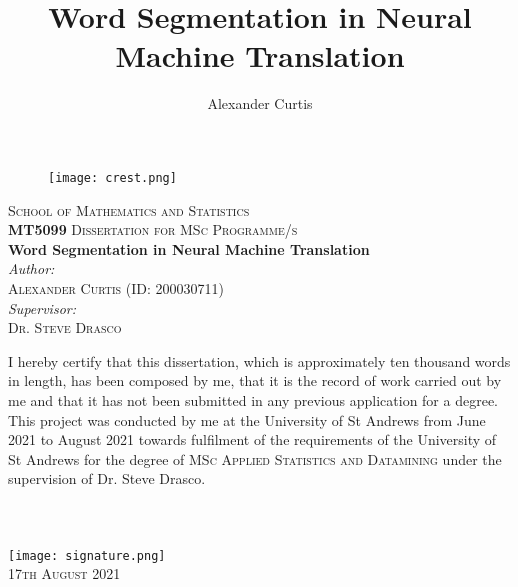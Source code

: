 \documentclass[11pt]{article}
\title{Word Segmentation in Neural Machine Translation}
\author{Alexander Curtis}
\begin{document}
\begin{titlepage}
\begin{center}
    \begin{figure}[h]
    \centering
    \texttt{[image: crest.png]}
    \end{figure}
    \textsc{School of Mathematics and Statistics} \\
    \textsc{\textbf{MT5099} Dissertation for MSc Programme/s} \\
    \vspace{1cm}
    \huge{\textbf{Word Segmentation in Neural Machine Translation}} \\
    \vspace{1cm}
    \normalsize
    \textit{Author:} \\
    \textsc{Alexander Curtis (ID: 200030711)} \\
    \textit{Supervisor:} \\
    \textsc{Dr. Steve Drasco} \\
    \vspace{3cm}
    \end{center}
    I hereby certify that this dissertation, which is approximately ten thousand words in length, has been composed by me, that it is the record of work carried out by me and that it has not been submitted in any previous application for a degree. This project was conducted by me at the University of St Andrews from June 2021 to August 2021 towards fulfilment of the requirements of the University of St Andrews for the degree of \textsc{MSc Applied Statistics and Datamining} under the supervision of Dr. Steve Drasco. \\
    \\
    \\
    \\
    \vspace{1cm}
    \texttt{[image: signature.png]} \\
    \vspace{1cm}
    \textsc{17th August 2021}
\end{titlepage}


\newpage

\end{document}
